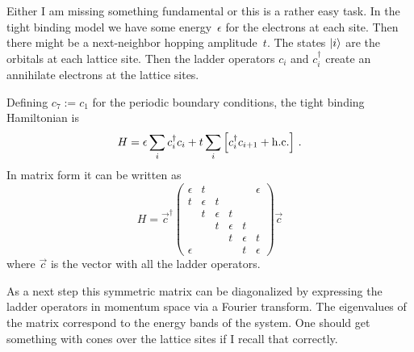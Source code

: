 \documentclass[11pt, english, fleqn, DIV=15, headinclude, BCOR=1cm]{scrartcl}
\begin{document}
Either I am missing something fundamental or this is a rather easy task. In the
tight binding model we have some energy~$\epsilon$ for the electrons at each site. Then
there might be a next-neighbor hopping amplitude~$t$. The states $\ket i$ are
the orbitals at each lattice site. Then the ladder operators $c_i$ and
$c_i^\dagger$ create an annihilate electrons at the lattice sites.

Defining $c_7 := c_1$ for the periodic boundary conditions, the tight binding
Hamiltonian is
\[
    H = \epsilon \sum_i c_i^\dagger c_i + t \sum_i \left[ c_i^\dagger c_{i+1} +
    \mathrm{h.c.} \right] \,.
\]
In matrix form it can be written as
\[
    H = \vec c^\dagger
    \begin{pmatrix}
        \epsilon & t &&&& \epsilon \\
        t & \epsilon & t &&& \\
          & t & \epsilon & t && \\
          && t & \epsilon & t & \\
          &&& t & \epsilon & t  \\
        \epsilon &&&& t & \epsilon
    \end{pmatrix}
    \vec c
\]
where $\vec c$ is the vector with all the ladder operators.

As a next step this symmetric matrix can be diagonalized by expressing the
ladder operators in momentum space via a Fourier transform. The eigenvalues of
the matrix correspond to the energy bands of the system. One should get
something with cones over the lattice sites if I recall that correctly.
\end{document}
